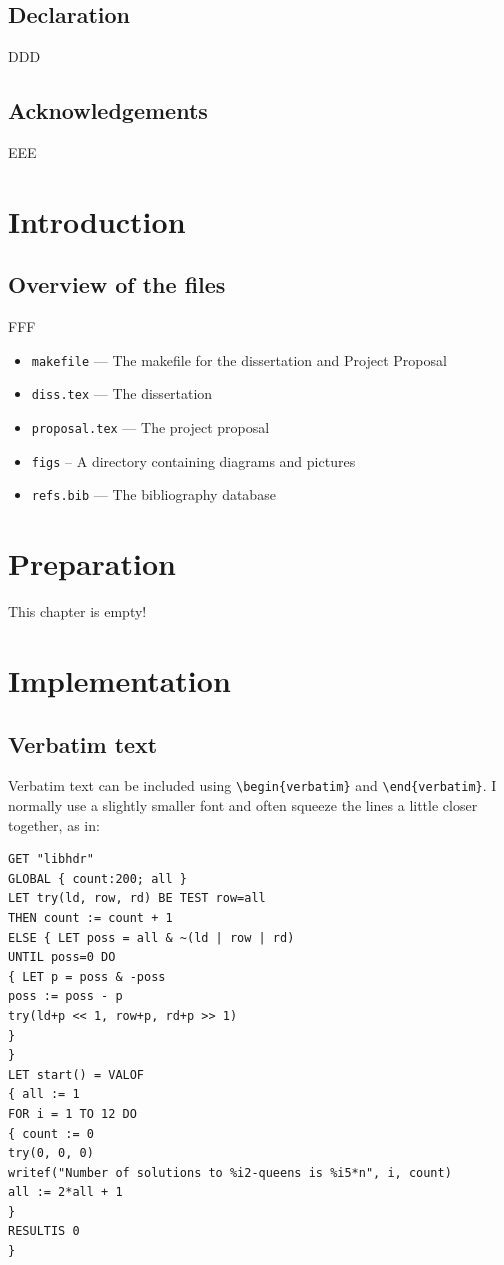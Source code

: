 \documentclass[12pt,a4paper,twoside,openright]{report}
\renewcommand{\baselinestretch}{1.1} %
\begin{document}
\section*{Declaration}
DDD

\bigskip
{}
\medskip
{}
\tableofcontents
\listoffigures
\newpage

\section*{Acknowledgements}
EEE
\pagestyle{headings}
\chapter{Introduction}
\section{Overview of the files}
FFF
\begin{itemize}
\item \texttt{makefile} --- The makefile for the dissertation and
Project Proposal
\item \texttt{diss.tex} --- The dissertation
\item \texttt{proposal.tex} --- The project proposal
\item \texttt{figs} -- A directory containing diagrams and pictures
\item \texttt{refs.bib} --- The bibliography database
\end{itemize}

\chapter{Preparation}
This chapter is empty!

\chapter{Implementation}
\section{Verbatim text}
Verbatim text can be included using \verb|\begin{verbatim}| and
\verb|\end{verbatim}|. I normally use a slightly smaller font and
often squeeze the lines a little closer together, as in:
{\renewcommand{\baselinestretch}{0.8}\small
\begin{verbatim}
GET "libhdr"
GLOBAL { count:200; all }
LET try(ld, row, rd) BE TEST row=all
THEN count := count + 1
ELSE { LET poss = all & ~(ld | row | rd)
UNTIL poss=0 DO
{ LET p = poss & -poss
poss := poss - p
try(ld+p << 1, row+p, rd+p >> 1)
}
}
LET start() = VALOF
{ all := 1
FOR i = 1 TO 12 DO
{ count := 0
try(0, 0, 0)
writef("Number of solutions to %i2-queens is %i5*n", i, count)
all := 2*all + 1
}
RESULTIS 0
}
\end{verbatim}
}
\end{document}
